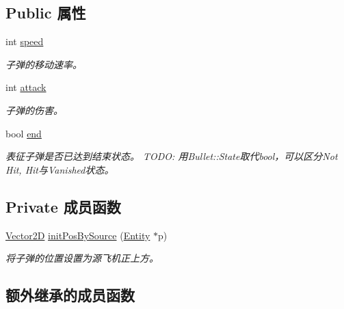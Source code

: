 \subsection*{Public 属性}
\begin{DoxyCompactItemize}
\item 
\mbox{\label{class_bullet_a110bd4348fc7547125b4ec4bbf94d5f5}} 
int \hyperlink{class_bullet_a110bd4348fc7547125b4ec4bbf94d5f5}{speed}
\begin{DoxyCompactList}\small\item\em 子弹的移动速率。 \end{DoxyCompactList}\item 
\mbox{\label{class_bullet_ab9e1e40341cddf25f8acc4e378b26f4a}} 
int \hyperlink{class_bullet_ab9e1e40341cddf25f8acc4e378b26f4a}{attack}
\begin{DoxyCompactList}\small\item\em 子弹的伤害。 \end{DoxyCompactList}\item 
\mbox{\label{class_bullet_aff37198e603e1a2b8ff28e0df6e156a4}} 
bool \hyperlink{class_bullet_aff37198e603e1a2b8ff28e0df6e156a4}{end}
\begin{DoxyCompactList}\small\item\em 表征子弹是否已达到结束状态。 T\+O\+DO\+: 用\+Bullet\+::\+State取代bool，可以区分\+Not Hit, Hit与\+Vanished状态。 \end{DoxyCompactList}\end{DoxyCompactItemize}
\subsection*{Private 成员函数}
\begin{DoxyCompactItemize}
\item 
\mbox{\label{class_bullet_ac8350c88346ae354e7144fa20b6cb2a2}} 
\hyperlink{structbasic__vector2_d}{Vector2D} \hyperlink{class_bullet_ac8350c88346ae354e7144fa20b6cb2a2}{init\+Pos\+By\+Source} (\hyperlink{class_entity}{Entity} $\ast$p)
\begin{DoxyCompactList}\small\item\em 将子弹的位置设置为源飞机正上方。 \end{DoxyCompactList}\end{DoxyCompactItemize}
\subsection*{额外继承的成员函数}


